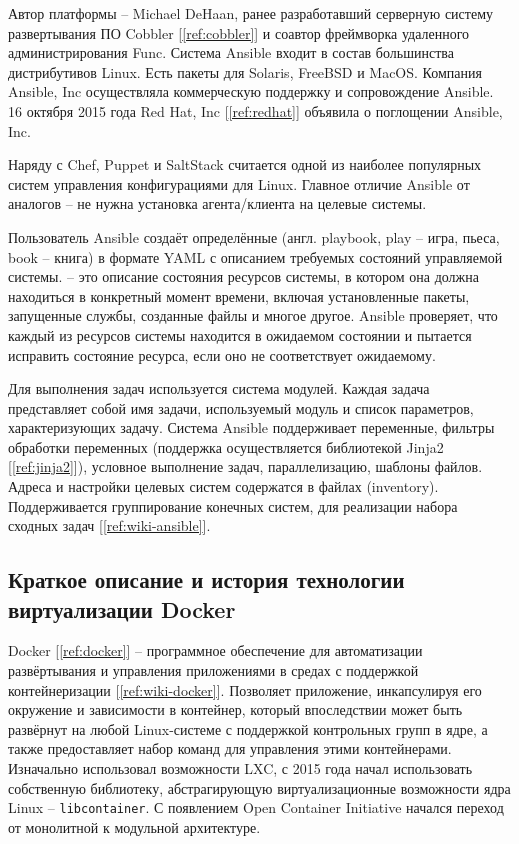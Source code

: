 Автор платформы -- Michael DeHaan, ранее разработавший серверную систему
развертывания ПО Cobbler [\ref{ref:cobbler}] и соавтор фреймворка удаленного
администрирования Func. Система Ansible входит в состав большинства
дистрибутивов Linux. Есть пакеты для Solaris, FreeBSD и MacOS. Компания Ansible,
Inc осуществляла коммерческую поддержку и сопровождение Ansible. 16 октября 2015
года Red Hat, Inc [\ref{ref:redhat}] объявила о поглощении Ansible, Inc.

Наряду с Chef, Puppet и SaltStack считается одной из наиболее популярных систем
управления конфигурациями для Linux. Главное отличие Ansible от аналогов -- не
нужна установка агента/клиента на целевые системы.

Пользователь Ansible создаёт определённые  (англ. playbook,
play -- игра, пьеса, book -- книга) в формате YAML с описанием требуемых
состояний управляемой системы.  -- это описание состояния
ресурсов системы, в котором она должна находиться в конкретный момент времени,
включая установленные пакеты, запущенные службы, созданные файлы и многое
другое. Ansible проверяет, что каждый из ресурсов системы находится в ожидаемом
состоянии и пытается исправить состояние ресурса, если оно не соответствует
ожидаемому.

Для выполнения задач используется система модулей. Каждая задача представляет
собой имя задачи, используемый модуль и список параметров, характеризующих
задачу. Система Ansible поддерживает переменные, фильтры обработки переменных
(поддержка осуществляется библиотекой Jinja2 [\ref{ref:jinja2}]), условное
выполнение задач, параллелизацию, шаблоны файлов. Адреса и настройки целевых
систем содержатся в файлах  (inventory). Поддерживается
группирование конечных систем, для реализации набора сходных задач
[\ref{ref:wiki-ansible}].

\subsection{Краткое описание и история технологии виртуализации Docker}
Docker [\ref{ref:docker}] -- программное обеспечение для автоматизации развёртывания
и управления приложениями в средах с поддержкой контейнеризации
[\ref{ref:wiki-docker}].
Позволяет  приложение, инкапсулируя его окружение и
зависимости в контейнер, который впоследствии может быть развёрнут на любой
Linux-системе с поддержкой контрольных групп в ядре, а также предоставляет набор
команд для управления этими контейнерами.
Изначально использовал возможности LXC, с 2015 года начал использовать
собственную библиотеку, абстрагирующую виртуализационные возможности ядра Linux
-- \texttt{libcontainer}.
С появлением Open Container Initiative начался переход от монолитной к модульной
архитектуре.

